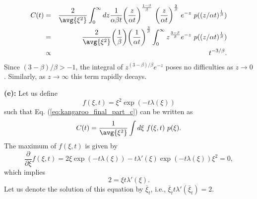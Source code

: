 \begin{eqnarray}
C(t) &=& \frac{2}{\avg{\xi^2}} \int_{0}^{\infty} dz \frac{1}{\alpha \beta t}\bigg( \frac{z}{\alpha t}\bigg)^\frac{1-\beta}{\beta} ~\bigg( \frac{z}{\alpha t}\bigg)^\frac{2}{\beta}~ e^{-z}  ~p((z/\alpha t)^\frac{1}{\beta}) \\
&=& \frac{2}{\avg{\xi^2}} \bigg(\frac{1}{\beta} \bigg) \bigg(\frac{1}{\alpha t}  \bigg)^{\frac{3}{\beta}}  \int_{0}^{\infty} z^\frac{3-\beta}{\beta} e^{-z}  ~p((z/\alpha t)^\frac{1}{\beta}) \\
&\propto& t^{-3/\beta}.
\end{eqnarray}
Since $(3-\beta)/\beta > -1$, the integral of $z^{(3-\beta)/ \beta} e^{-z}$ poses no difficulties as $z\rightarrow0$. Similarly, as $z\rightarrow \infty$ this term rapidly decays.

\textbf{(e):} Let us define
\begin{equation}
f(\xi, t) = \xi^2 \exp(-t\lambda(\xi)) 
\end{equation}
such that Eq. (\ref{eq:kangaroo_final_part_c}) can be written as
\begin{equation}
C(t) = \frac{1}{\avg{\xi^2}} \int d \xi~f(\xi, t) ~p(\xi).  \label{eq:kangaroo_correlation_fxn_in_f}
\end{equation}
The maximum of $f(\xi, t)$ is given by
\begin{equation}
\frac{\partial}{\partial \xi} f(\xi, t) = 2 \xi \exp(-t \lambda(\xi)) -  t \lambda'(\xi) \exp(-t \lambda(\xi)) \xi^2 = 0, \nonumber
\end{equation}
which implies
\begin{equation}
2 = \xi  t \lambda'(\xi). \nonumber
\end{equation}
Let us denote the solution of this equation by $\bar{\xi}_t$, i.e., $\bar{\xi}_t t \lambda'(\bar{\xi}_t) = 2$. 

